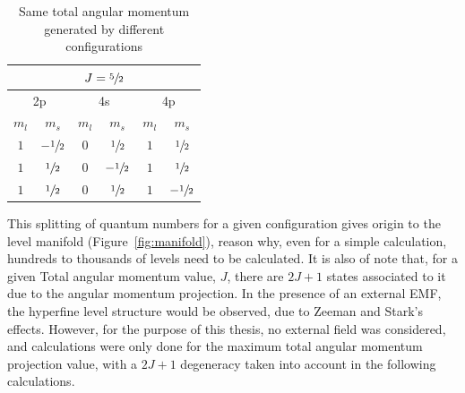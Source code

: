 \begin{table}[h!]
    \centering
    \caption{Same total angular momentum generated by different configurations}\label{tab:epsilon}
    \begin{tabular}{cc| cc | cc}
        \toprule\multicolumn{6}{c}{$J=\sfrac{5}{2}$}\\\midrule
        \multicolumn{2}{c|}{2p}&\multicolumn{2}{c|}{4s}&\multicolumn{2}{c}{4p}\\
        $m_l$ & $m_s$ & $m_l$&$m_s$&$m_l$&$m_s$\\\midrule
        $1$&$-\sfrac{1}{2}$&$0$&$\sfrac{1}{2}$&$1$&$\sfrac{1}{2}$\\
        $1$&$\sfrac{1}{2}$&$0$&$-\sfrac{1}{2}$&$1$&$\sfrac{1}{2}$\\
        $1$&$\sfrac{1}{2}$&$0$&$\sfrac{1}{2}$&$1$&$-\sfrac{1}{2}$\\\bottomrule
    \end{tabular}
\end{table}

This splitting of quantum numbers for a given configuration gives origin to the level manifold (Figure~\ref{fig:manifold}), reason why, even for a simple calculation, hundreds to thousands of levels need to be calculated. It is also of note that, for a given Total angular momentum value, $J$, there are $2J+1$ states associated to it due to the angular momentum projection. In the presence of an external \gls{EMF}, the hyperfine level structure would be observed, due to Zeeman and Stark's effects. However, for the purpose of this thesis, no external field was considered, and calculations were only done for the maximum total angular momentum projection value, with a $2J+1$ degeneracy taken into account in the following calculations.

